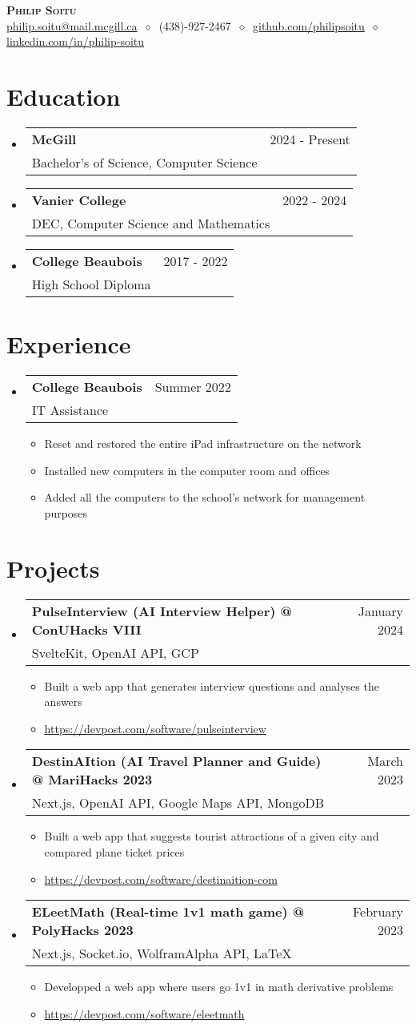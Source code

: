 \documentclass[letterpaper,11pt]{article}
\makeatletter
\newcommand{\cvitem}[1]{
  \item\small{
    {#1\vspace{-2pt}}
  }
}
\newcommand{\cvheading}[4]{
  \vspace{-2pt}\item
    \begin{tabular*}{\textwidth}[t]{l@{\extracolsep{\fill}}r}
      \large\textbf{#1} & #2 \\
      \small#3 & \small #4 \\
    \end{tabular*}\vspace{-7pt}
}
\newcommand{\cvheadingstart}{\begin{itemize}[leftmargin=0in, label={}]}
\newcommand{\cvheadingend}{\end{itemize}}
\newcommand{\cvitemstart}{\begin{itemize}[label=\textopenbullet]\justifying}
\newcommand{\cvitemend}{\end{itemize}\vspace{-5pt}}
\makeatother
\begin{document}
\begin{center}
  \textbf{\LARGE\scshape Philip Soitu} \\
  \vspace{1pt}\small
  \href{mailto:philip.soitu@gmail.com}{philip.soitu@mail.mcgill.ca}
  $\ \diamond\ $
  (438)-927-2467
  $\ \diamond\ $
  \href{https://github.com/philipsoitu}{github.com/philipsoitu}
  $\ \diamond\ $
  \href{https://www.linkedin.com/in/philip-soitu-7a40a3240/}{linkedin.com/in/philip-soitu}
\end{center}

\section{Education}
\cvheadingstart
  \cvheading
    {McGill}{2024 - Present}
    {Bachelor's of Science, Computer Science}{}
  \cvheading
    {Vanier College}{2022 - 2024}
    {DEC, Computer Science and Mathematics}{}
  \cvheading
    {College Beaubois}{2017 - 2022}
    {High School Diploma}{}
\cvheadingend

\section{Experience}
\cvheadingstart
  \cvheading
    {College Beaubois}{Summer 2022}
    {IT Assistance}{}
  \cvitemstart
    \cvitem{Reset and restored the entire iPad infrastructure on the network}
    \cvitem{Installed new computers in the computer room and offices}
    \cvitem{Added all the computers to the school's network for management purposes}
  \cvitemend
\cvheadingend

\section{Projects}
\cvheadingstart
  \cvheading
    {PulseInterview (AI Interview Helper) @ ConUHacks VIII}{January 2024}
    {SvelteKit, OpenAI API, GCP}{}
  \cvitemstart
    \cvitem{Built a web app that generates interview questions and analyses the answers}
    \cvitem{\href{www.devpost.com/software/pulseinterview}{https://devpost.com/software/pulseinterview}}
  \cvitemend
  \cvheading
    {DestinAItion (AI Travel Planner and Guide) @ MariHacks 2023}{March 2023}
    {Next.js, OpenAI API, Google Maps API, MongoDB}{}
  \cvitemstart
    \cvitem{Built a web app that suggests tourist attractions of a given city and compared plane ticket prices}
    \cvitem{\href{https://devpost.com/software/destinaition-com}{https://devpost.com/software/destinaition-com}}
  \cvitemend
  \cvheading
    {ELeetMath (Real-time 1v1 math game) @ PolyHacks 2023}{February 2023}
    {Next.js, Socket.io, WolframAlpha API, LaTeX}{}
  \cvitemstart
    \cvitem{Developped a web app where users go 1v1 in math derivative problems}
    \cvitem{\href{https://devpost.com/software/eleetmath}{https://devpost.com/software/eleetmath}}
  \cvitemend
\cvheadingend
\end{document}
